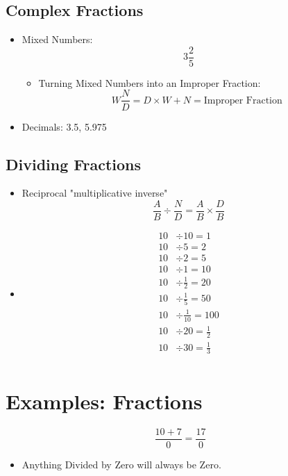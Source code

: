 \documentclass[]{article}
\begin{document}
\subsection{Complex Fractions}
\begin{itemize}
	\item Mixed Numbers:
	\begin{equation}
	3 \frac{2}{5}
	\end{equation}
	\begin{itemize}
		\item Turning Mixed Numbers into an Improper Fraction:
		\begin{equation*}
			W \frac{N}{D} = D \times W + N = \text{Improper Fraction}
		\end{equation*}
	\end{itemize}
	\item Decimals:  3.5, 5.975
\end{itemize}


\subsection{Dividing  Fractions}
\begin{itemize}
	\item Reciprocal "multiplicative inverse"
	\begin{equation*}
		\frac{A}{B} \div \frac{N}{D}  =  \frac{A}{B} \times \frac{D}{B}		
	\end{equation*}
	\item
	\begin{equation}
		\begin{split}
		10 &\div 10 = 1 \\
		10 &\div 5 = 2 \\
		10 &\div 2 = 5 \\
		10 &\div 1 = 10 \\
		10 &\div \frac{1}{2} = 20 \\
		10 &\div \frac{1}{5} = 50 \\
		10 &\div \frac{1}{10} = 100 \\
		10 &\div 20 = \frac{1}{2} \\
		10 &\div 30 = \frac{1}{3} \\
		\end{split}
	\end{equation}
\end{itemize}


\section{Examples: Fractions}
\begin{equation}
	\frac {10+7}{0} = \frac{17}{0}
\end{equation}
\begin{itemize}
	\item Anything Divided by Zero will always be Zero.
\end{itemize}
\end{document}
